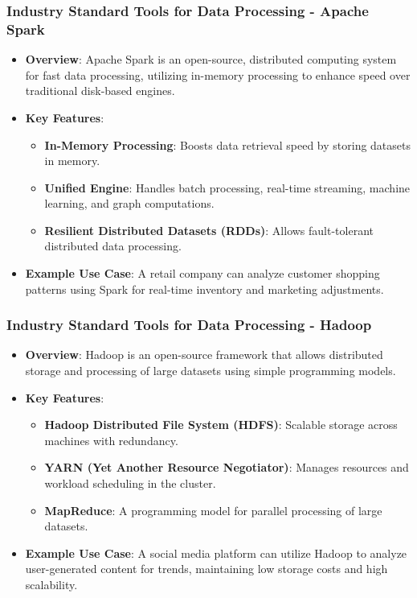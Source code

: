 \documentclass[aspectratio=169]{beamer}
\begin{document}
\begin{frame}[fragile]
    \frametitle{Industry Standard Tools for Data Processing - Apache Spark}
    \begin{itemize}
        \item \textbf{Overview}: 
        Apache Spark is an open-source, distributed computing system for fast data processing, utilizing in-memory processing to enhance speed over traditional disk-based engines.
        
        \item \textbf{Key Features}:
        \begin{itemize}
            \item \textbf{In-Memory Processing}: Boosts data retrieval speed by storing datasets in memory.
            \item \textbf{Unified Engine}: Handles batch processing, real-time streaming, machine learning, and graph computations.
            \item \textbf{Resilient Distributed Datasets (RDDs)}: Allows fault-tolerant distributed data processing.
        \end{itemize}

        \item \textbf{Example Use Case}: 
        A retail company can analyze customer shopping patterns using Spark for real-time inventory and marketing adjustments.
    \end{itemize}
\end{frame}

\begin{frame}[fragile]
    \frametitle{Industry Standard Tools for Data Processing - Hadoop}
    \begin{itemize}
        \item \textbf{Overview}: 
        Hadoop is an open-source framework that allows distributed storage and processing of large datasets using simple programming models.
        
        \item \textbf{Key Features}:
        \begin{itemize}
            \item \textbf{Hadoop Distributed File System (HDFS)}: Scalable storage across machines with redundancy.
            \item \textbf{YARN (Yet Another Resource Negotiator)}: Manages resources and workload scheduling in the cluster.
            \item \textbf{MapReduce}: A programming model for parallel processing of large datasets.
        \end{itemize}
        
        \item \textbf{Example Use Case}: 
        A social media platform can utilize Hadoop to analyze user-generated content for trends, maintaining low storage costs and high scalability.
    \end{itemize}
\end{frame}
\end{document}
